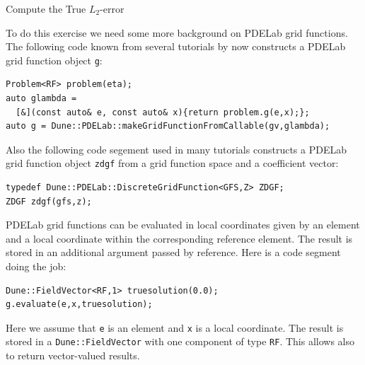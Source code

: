 \documentclass[12pt,a4paper]{article}
\begin{document}
\begin{Exercise}{Compute the True $L_2$-error}

To do this exercise we need some more background on PDELab grid functions.
The following code known from several tutorials by now
constructs a PDELab grid function object \lstinline{g}:
\begin{lstlisting}[basicstyle=\ttfamily\small,
frame=single,
backgroundcolor=\color{listingbg}]
Problem<RF> problem(eta);
auto glambda =
  [&](const auto& e, const auto& x){return problem.g(e,x);};
auto g = Dune::PDELab::makeGridFunctionFromCallable(gv,glambda);
\end{lstlisting}
Also the following code segement used in many tutorials constructs
a PDELab grid function object \lstinline{zdgf} from a grid function space and
a coefficient vector:
\begin{lstlisting}[basicstyle=\ttfamily\small,
frame=single,
backgroundcolor=\color{listingbg}]
typedef Dune::PDELab::DiscreteGridFunction<GFS,Z> ZDGF;
ZDGF zdgf(gfs,z);
\end{lstlisting}
PDELab grid functions can be evaluated in local coordinates given by an
element and a local coordinate within the corresponding reference element.
The result is stored in an additional argument passed by reference.
Here is a code segment doing the job:
\begin{lstlisting}[basicstyle=\ttfamily\small,
frame=single,
backgroundcolor=\color{listingbg}]
Dune::FieldVector<RF,1> truesolution(0.0);
g.evaluate(e,x,truesolution);
\end{lstlisting}
Here we assume that \lstinline{e} is an element and \lstinline{x} is a local coordinate.
The result is stored in a \lstinline{Dune::FieldVector} with one component of type
\lstinline{RF}. This allows also to return vector-valued results.


\end{Exercise}
\end{document}
